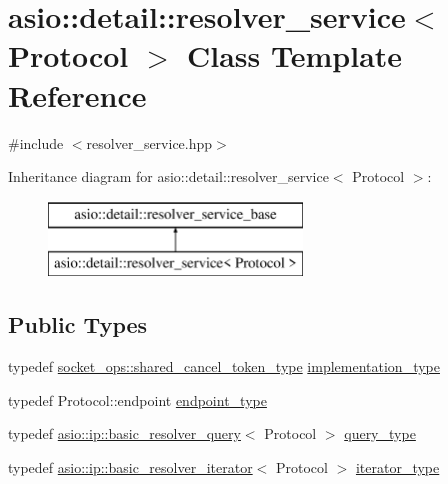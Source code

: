 \hypertarget{classasio_1_1detail_1_1resolver__service}{}\section{asio\+:\+:detail\+:\+:resolver\+\_\+service$<$ Protocol $>$ Class Template Reference}
\label{classasio_1_1detail_1_1resolver__service}


{\ttfamily \#include $<$resolver\+\_\+service.\+hpp$>$}

Inheritance diagram for asio\+:\+:detail\+:\+:resolver\+\_\+service$<$ Protocol $>$\+:\begin{figure}[H]
\begin{center}
\leavevmode
\includegraphics[height=2.000000cm]{classasio_1_1detail_1_1resolver__service}
\end{center}
\end{figure}
\subsection*{Public Types}
\begin{DoxyCompactItemize}
\item 
typedef \hyperlink{namespaceasio_1_1detail_1_1socket__ops_a6f7dec33c65c050a3ee96d6b17dafc9c}{socket\+\_\+ops\+::shared\+\_\+cancel\+\_\+token\+\_\+type} \hyperlink{classasio_1_1detail_1_1resolver__service_a9b39aff4ee39b0f45731ec01d9f5fd74}{implementation\+\_\+type}
\item 
typedef Protocol\+::endpoint \hyperlink{classasio_1_1detail_1_1resolver__service_a4c9bdef1b2990355b5e02df3056554df}{endpoint\+\_\+type}
\item 
typedef \hyperlink{classasio_1_1ip_1_1basic__resolver__query}{asio\+::ip\+::basic\+\_\+resolver\+\_\+query}$<$ Protocol $>$ \hyperlink{classasio_1_1detail_1_1resolver__service_a3200fbe0279811d68ebacc1bd28d4418}{query\+\_\+type}
\item 
typedef \hyperlink{classasio_1_1ip_1_1basic__resolver__iterator}{asio\+::ip\+::basic\+\_\+resolver\+\_\+iterator}$<$ Protocol $>$ \hyperlink{classasio_1_1detail_1_1resolver__service_ab9c188c775855b13d06f6682014cbf55}{iterator\+\_\+type}
\end{DoxyCompactItemize}
